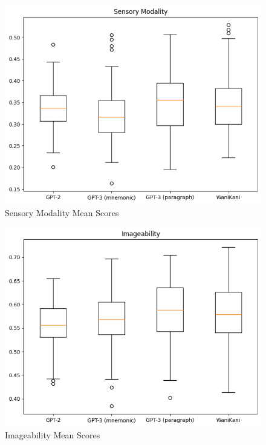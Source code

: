 \begin{figure}
    \centering
    \includegraphics[width=400pt]{resources/ser_mean_box_plot.png}
    \caption{Sensory Modality Mean Scores}
    \label{figure:ser_mean_box_plot}
\end{figure}

\begin{figure}
    \centering
    \includegraphics[width=400pt]{resources/img_mean_box_plot.png}
    \caption{Imageability Mean Scores}
    \label{figure:img_mean_box_plot}
\end{figure}

